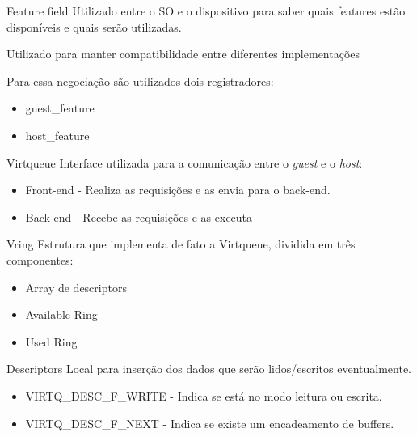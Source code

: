 \documentclass[brazil,nolapesd,aspectratio=169,noartschool]{lapesd-slides}
\begin{document}
\begin{frame}{Feature field}
   Utilizado entre o SO e o dispositivo para saber quais features estão disponíveis e quais serão utilizadas.

   \vspace{1em}

   Utilizado para manter compatibilidade entre diferentes implementações

   \vspace{1em}

   Para essa negociação são utilizados dois registradores:
   \begin{itemize}
       \item guest{\_}feature
       \item host{\_}feature
   \end{itemize}
\end{frame}

\begin{frame}{Virtqueue}
	Interface utilizada para a comunicação entre o \textit{guest} e o \textit{host}:

	\begin{itemize}
		\item Front-end - Realiza as requisições e as envia para o back-end.
		\item Back-end - Recebe as requisições e as executa
	\end{itemize}


\end{frame}

\begin{frame}{Vring}
	Estrutura que implementa de fato a Virtqueue, dividida em três componentes:

	\begin{itemize}
		\item Array de descriptors
		\item Available Ring
		\item Used Ring
	\end{itemize}
\end{frame}

\begin{frame}{Descriptors}
	Local para inserção dos dados que serão lidos/escritos eventualmente.


	\begin{itemize}
		\item VIRTQ{\_}DESC{\_}F{\_}WRITE - Indica se está no modo leitura ou escrita.
		\item VIRTQ{\_}DESC{\_}F{\_}NEXT - Indica se existe um encadeamento de buffers.
	\end{itemize}
\end{frame}
\end{document}
